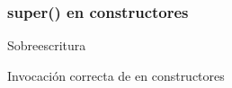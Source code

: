 \documentclass[10pt,envcountsect,spanish]{beamer}
\begin{document}





\subsubsection{super() en constructores}



\begin{frame}

\hfil\hfil\begin{minipage}{.7\textwidth}
\begin{alertblock}{Sobreescritura}
\centerline{Invocación correcta de  en constructores}
\end{alertblock}
\end{minipage}
\end{frame}
\end{document}
